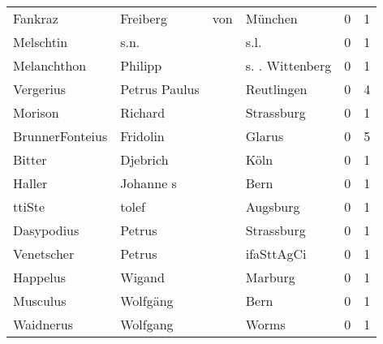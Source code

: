 \begin{tabular}{llllrr}
                  Fankraz &                           Freiberg &         von &                                     München &          0 &         1 \\
                Melschtin &                               s.n. &             &                                        s.l. &          0 &         1 \\
              Melanchthon &                            Philipp &             &                             s. . Wittenberg &          0 &         1 \\
                Vergerius &                      Petrus Paulus &             &                                  Reutlingen &          0 &         4 \\
                  Morison &                            Richard &             &                                  Strassburg &          0 &         1 \\
          BrunnerFonteius &                           Fridolin &             &                                      Glarus &          0 &         5 \\
                   Bitter &                           Djebrich &             &                                        Köln &          0 &         1 \\
                   Haller &                          Johanne s &             &                                        Bern &          0 &         1 \\
                   ttiSte &                              tolef &             &                                    Augsburg &          0 &         1 \\
               Dasypodius &                             Petrus &             &                                  Strassburg &          0 &         1 \\
               Venetscher &                             Petrus &             &                                  ifaSttAgCi &          0 &         1 \\
                 Happelus &                             Wigand &             &                                     Marburg &          0 &         1 \\
                 Musculus &                           Wolfgäng &             &                                        Bern &          0 &         1 \\
                Waidnerus &                           Wolfgang &             &                                       Worms &          0 &         1 \\

\end{tabular}

